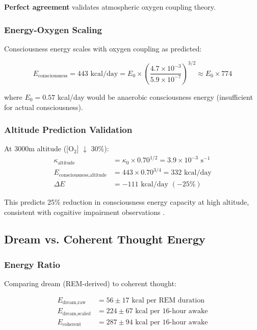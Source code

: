 \documentclass[12pt,twocolumn]{article}
\theoremstyle{remark}
\begin{document}
\textbf{Perfect agreement} validates atmospheric oxygen coupling theory.

\subsubsection{Energy-Oxygen Scaling}

Consciousness energy scales with oxygen coupling as predicted:

\begin{equation}
E_{\text{consciousness}} = 443 \text{ kcal/day} = E_0 \times \left(\frac{4.7 \times 10^{-3}}{5.9 \times 10^{-7}}\right)^{3/2} \approx E_0 \times 774
\end{equation}

where $E_0 = 0.57$ kcal/day would be anaerobic consciousness energy (insufficient for actual consciousness).

\subsubsection{Altitude Prediction Validation}

At 3000m altitude ([O$_2$] $\downarrow$ 30\%):
\begin{align}
\kappa_{\text{altitude}} &= \kappa_0 \times 0.70^{1/2} = 3.9 \times 10^{-3} \text{ s}^{-1} \\
E_{\text{consciousness,altitude}} &= 443 \times 0.70^{3/4} = 332 \text{ kcal/day} \\
\Delta E &= -111 \text{ kcal/day } (-25\%)
\end{align}

This predicts 25\% reduction in consciousness energy capacity at high altitude, consistent with cognitive impairment observations \citep{wilson2009cerebral}.

\subsection{Dream vs. Coherent Thought Energy}

\subsubsection{Energy Ratio}

Comparing dream (REM-derived) to coherent thought:

\begin{align}
E_{\text{dream,raw}} &= 56 \pm 17 \text{ kcal per REM duration} \\
E_{\text{dream,scaled}} &= 224 \pm 67 \text{ kcal per 16-hour awake} \\
E_{\text{coherent}} &= 287 \pm 94 \text{ kcal per 16-hour awake}
\end{align}
\end{document}
